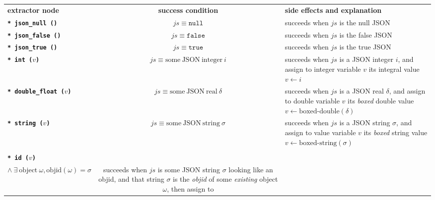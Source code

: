 \begin{table}[!htbp]
  \begin{relsize}{-1.2}
  \begin{center}
    \begin{tabular}{lcp{5.7cm}}
      \textbf{extractor node} & \hspace*{1cm} \textbf{success condition} \hspace*{1cm}  & \textbf{side effects and explanation} \\
      \texttt{\textbf{* json\_null ()}} &
      $\mathit{js} \equiv \mathtt{null}$ &
      succeeds when $\mathit{js}$ is the null JSON \\
      \texttt{\textbf{* json\_false ()}} &
      $\mathit{js} \equiv \mathtt{false}$ &
      succeeds when $\mathit{js}$ is the false JSON \\
      \texttt{\textbf{* json\_true ()}} &
      $\mathit{js} \equiv \mathtt{true}$ &
      succeeds when $\mathit{js}$ is the true JSON \\
      \texttt{\textbf{* int ($v$)}} &
      $\mathit{js} \equiv \mathrm{some ~ JSON ~ integer}~ i$ &
      succeeds when $\mathit{js}$ is a JSON integer $i$, and assign to integer
      variable $v$ its integral value $v \leftarrow i$\\
      \texttt{\textbf{* double\_float ($v$)}} &
      $\mathit{js} \equiv \mathrm{some ~ JSON ~ real}~ \delta$ &
      succeeds when $\mathit{js}$ is a JSON real $\delta$, and assign to double
      variable $v$ its \emph{boxed} double value $v \leftarrow
      \mathrm{\textrm{boxed-double}} (\delta)$\\
      \texttt{\textbf{* string ($v$)}} &
      $\mathit{js} \equiv \mathrm{some ~ JSON ~ string}~ \sigma$ &
      succeeds when $\mathit{js}$ is a JSON string $\sigma$, and assign to
      value variable $v$ its \emph{boxed} string value $v \leftarrow
      \mathrm{\textrm{boxed-string}} (\sigma)$ \\
            \rule{0pt}{1ex} \\
      \texttt{\textbf{* id ($v$)}} &
      \begin{minipage}[t]{4cm}
        $\mathit{js} \equiv \mathrm{some ~ JSON ~ string}~ \sigma$\\
        \hspace*{0.5em} $ \wedge ~ \exists ~ \mathrm{object} ~ \omega, \mathrm{objid}(\omega) = \sigma$ 
      \end{minipage}
      &
      succeeds when $\mathit{js}$ is some JSON string $\sigma$ looking like an objid, and that string $\sigma$ is the \emph{objid} of some \emph{existing} object $\omega$, then assign to

\end{tabular}
\end{center}
\end{relsize}
\end{table}

